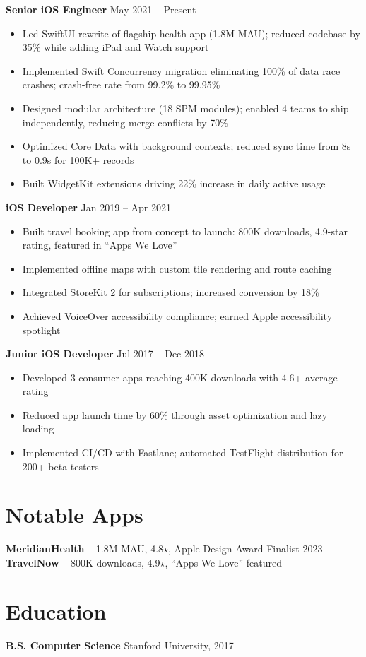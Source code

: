 \documentclass[10.5pt,a4paper]{article}
\begin{document}
\textbf{Senior iOS Engineer}  \hfill May 2021 -- Present
\begin{itemize}
  \item Led SwiftUI rewrite of flagship health app (1.8M MAU); reduced codebase by 35\% while adding iPad and Watch support
  \item Implemented Swift Concurrency migration eliminating 100\% of data race crashes; crash-free rate from 99.2\% to 99.95\%
  \item Designed modular architecture (18 SPM modules); enabled 4 teams to ship independently, reducing merge conflicts by 70\%
  \item Optimized Core Data with background contexts; reduced sync time from 8s to 0.9s for 100K+ records
  \item Built WidgetKit extensions driving 22\% increase in daily active usage
\end{itemize}

\vspace{4pt}

\textbf{iOS Developer}  \hfill Jan 2019 -- Apr 2021
\begin{itemize}
  \item Built travel booking app from concept to launch: 800K downloads, 4.9-star rating, featured in ``Apps We Love''
  \item Implemented offline maps with custom tile rendering and route caching
  \item Integrated StoreKit 2 for subscriptions; increased conversion by 18\%
  \item Achieved VoiceOver accessibility compliance; earned Apple accessibility spotlight
\end{itemize}

\vspace{4pt}

\textbf{Junior iOS Developer}  \hfill Jul 2017 -- Dec 2018
\begin{itemize}
  \item Developed 3 consumer apps reaching 400K downloads with 4.6+ average rating
  \item Reduced app launch time by 60\% through asset optimization and lazy loading
  \item Implemented CI/CD with Fastlane; automated TestFlight distribution for 200+ beta testers
\end{itemize}

\section{Notable Apps}
\textbf{MeridianHealth} -- 1.8M MAU, 4.8$\star$, Apple Design Award Finalist 2023\\[3pt]
\textbf{TravelNow} -- 800K downloads, 4.9$\star$, ``Apps We Love'' featured

\section{Education}
\textbf{B.S. Computer Science} \hfill Stanford University, 2017
\end{document}
